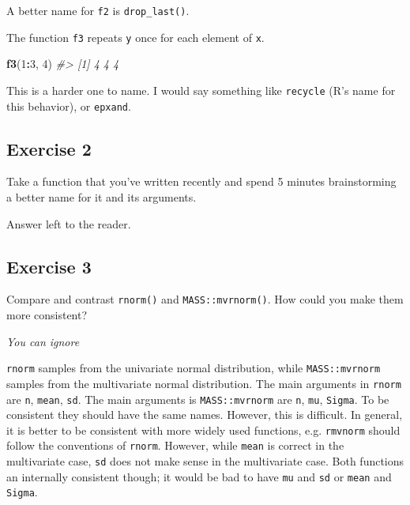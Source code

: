 \documentclass[]{book}
\newenvironment{Shaded}{\begin{snugshade}}{\end{snugshade}}
\newcommand{\CommentTok}[1]{\textcolor[rgb]{0.56,0.35,0.01}{\textit{#1}}}
\newcommand{\DecValTok}[1]{\textcolor[rgb]{0.00,0.00,0.81}{#1}}
\newcommand{\KeywordTok}[1]{\textcolor[rgb]{0.13,0.29,0.53}{\textbf{#1}}}
\newcommand{\NormalTok}[1]{#1}
\newcommand{\OperatorTok}[1]{\textcolor[rgb]{0.81,0.36,0.00}{\textbf{#1}}}
\theoremstyle{definition}
\theoremstyle{definition}
\theoremstyle{definition}
\theoremstyle{remark}
\begin{document}
A better name for \texttt{f2} is \texttt{drop\_last()}.

The function \texttt{f3} repeats \texttt{y} once for each element of
\texttt{x}.

\begin{Shaded}
\begin{Highlighting}[]
\KeywordTok{f3}\NormalTok{(}\DecValTok{1}\OperatorTok{:}\DecValTok{3}\NormalTok{, }\DecValTok{4}\NormalTok{)}
\CommentTok{#> [1] 4 4 4}
\end{Highlighting}
\end{Shaded}

This is a harder one to name. I would say something like
\texttt{recycle} (R's name for this behavior), or \texttt{epxand}.

\hypertarget{exercise-2-44}{%
\subsection{Exercise 2}\label{exercise-2-44}}

Take a function that you've written recently and spend 5 minutes
brainstorming a better name for it and its arguments.

Answer left to the reader.

\hypertarget{exercise-3-32}{%
\subsection{Exercise 3}\label{exercise-3-32}}

Compare and contrast \texttt{rnorm()} and \texttt{MASS::mvrnorm()}. How
could you make them more consistent?

\emph{You can ignore}

\texttt{rnorm} samples from the univariate normal distribution, while
\texttt{MASS::mvrnorm} samples from the multivariate normal
distribution. The main arguments in \texttt{rnorm} are \texttt{n},
\texttt{mean}, \texttt{sd}. The main arguments is \texttt{MASS::mvrnorm}
are \texttt{n}, \texttt{mu}, \texttt{Sigma}. To be consistent they
should have the same names. However, this is difficult. In general, it
is better to be consistent with more widely used functions, e.g.
\texttt{rmvnorm} should follow the conventions of \texttt{rnorm}.
However, while \texttt{mean} is correct in the multivariate case,
\texttt{sd} does not make sense in the multivariate case. Both functions
an internally consistent though; it would be bad to have \texttt{mu} and
\texttt{sd} or \texttt{mean} and \texttt{Sigma}.
\end{document}
